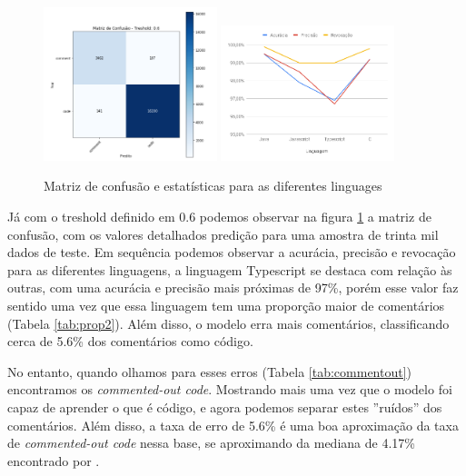\documentclass[12pt]{article}
\begin{document}
\begin{figure}[ht]
  \centering
  \includegraphics[width=0.45\textwidth]{../images/confmat.png}
  \includegraphics[width=0.45\textwidth]{../images/chart-ling.png}
  \caption{Matriz de confusão e estatísticas para as diferentes linguages }
  \label{fig:confmat}
\end{figure}


Já com o treshold definido em 0.6 podemos observar na figura \ref{fig:confmat} a  matriz de 
confusão, com os valores detalhados predição para uma amostra de trinta mil dados de teste.
Em sequência podemos observar a acurácia, precisão e revocação para as diferentes linguagens,
a linguagem Typescript se destaca com relação às outras, com uma acurácia e precisão mais próximas
de 97\%, porém esse valor faz sentido uma vez que essa linguagem tem uma proporção maior de 
comentários (Tabela \ref{tab:prop2}). Além disso, o modelo erra mais comentários, classificando
cerca de 5.6\% dos comentários como código.


No entanto, quando olhamos para esses erros (Tabela \ref{tab:commentout}) encontramos os 
\textit{commented-out code}. Mostrando mais uma vez que o modelo foi capaz de aprender o 
que é código, e agora podemos separar estes ''ruídos'' dos comentários. Além disso, a taxa 
de erro de 5.6\% é uma boa aproximação da taxa de \textit{commented-out code} nessa base, se
aproximando da mediana de 4.17\% encontrado por \cite{articleMiningComments}. 
\end{document}
